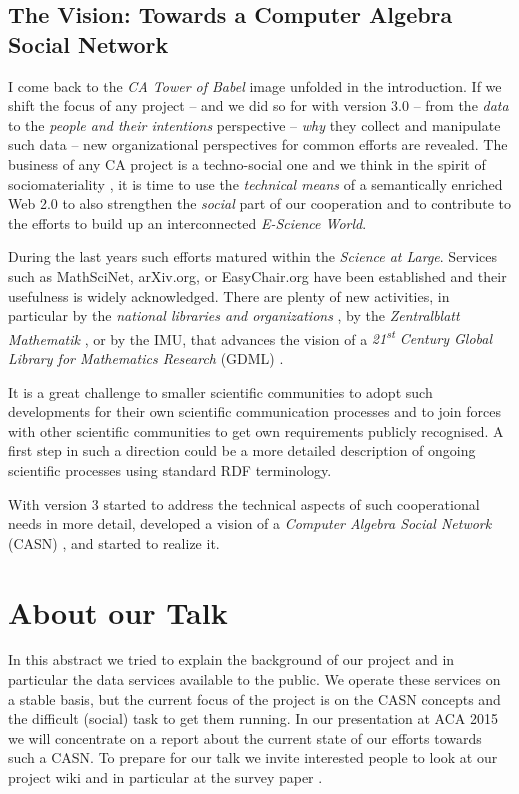 \documentclass[11pt]{article}
\begin{document}
\subsection{The Vision: Towards a Computer Algebra Social Network}

I come back to the \emph{CA Tower of Babel} image unfolded in the introduction.
If we shift the focus of any project -- and we did so for {\SD} with version
3.0 -- from the \emph{data} to the \emph{people and their intentions}
perspective -- \emph{why} they collect and manipulate such data -- new
organizational perspectives for common efforts are revealed.  The business of
any CA project is a techno-social one and we think in the spirit of
sociomateriality \cite{Sociomateriality}, it is time to use the \emph{technical
  means} of a semantically enriched Web 2.0 to also strengthen the
\emph{social} part of our cooperation and to contribute to the efforts to build
up an interconnected \emph{E-Science World}.

During the last years such efforts matured within the \emph{Science at Large}.
Services such as MathSciNet, arXiv.org, or EasyChair.org have been established
and their usefulness is widely acknowledged. There are plenty of new
activities, in particular by the \emph{national libraries and organizations}
\cite{VIAF}, by the \emph{Zentralblatt Mathematik} \cite{postagging}, or by the
IMU, that advances the vision of a \emph{21\textsuperscript{st} Century Global
  Library for Mathematics Research} (GDML) \cite{GDML}.

It is a great challenge to smaller scientific communities to adopt such
developments for their own scientific communication processes and to join
forces with other scientific communities to get own requirements publicly
recognised.  A first step in such a direction could be a more detailed
description of ongoing scientific processes using standard RDF terminology.

With version 3 {\SD} started to address the technical aspects of such
cooperational needs in more detail, developed a vision of a \emph{Computer
  Algebra Social Network} (CASN) \cite{casn}, and started to realize it.

\section{About our Talk}

In this abstract we tried to explain the background of our project and in
particular the data services available to the public. We operate these services
on a stable basis, but the current focus of the project is on the CASN concepts
and the difficult (social) task to get them running. In our presentation at ACA
2015 we will concentrate on a report about the current state of our efforts
towards such a CASN. To prepare for our talk we invite interested people to
look at our project wiki \cite{sdwiki} and in particular at the survey paper
\cite{casn}.
\end{document}
